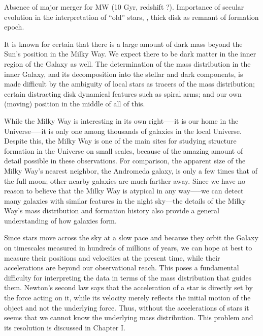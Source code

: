 Absence of major merger for MW (10 Gyr, redshift ?). Importance of
secular evolution in the interpretation of ``old'' stars, \eg, thick
disk as remnant of formation epoch.


It is known for certain that there is a large amount of dark mass
beyond the Sun’s position in the Milky Way. We expect there to be dark
matter in the inner region of the Galaxy as well. The determination of
the mass distribution in the inner Galaxy, and its decomposition into
the stellar and dark components, is made difficult by the ambiguity of
local stars as tracers of the mass distribution; certain distracting
disk dynamical features such as spiral arms; and our own (moving)
position in the middle of all of this.

While the Milky Way is interesting in its own right—--it is our home
in the Universe--—it is only one among thousands of galaxies in the
local Universe. Despite this, the Milky Way is one of the main sites
for studying structure formation in the Universe on small scales,
because of the amazing amount of detail possible in these
observations. For comparison, the apparent size of the Milky Way’s
nearest neighbor, the Andromeda galaxy, is only a few times that of
the full moon; other nearby galaxies are much farther away. Since we
have no reason to believe that the Milky Way is atypical in any
way—--we can detect many galaxies with similar features in the night
sky—the details of the Milky Way’s mass distribution and formation
history also provide a general understanding of how galaxies form.


Since stars move across the sky at a slow pace and because they orbit
the Galaxy on timescales measured in hundreds of millions of years, we
can hope at best to measure their positions and velocities at the
present time, while their accelerations are beyond our observational
reach. This poses a fundamental difficulty for interpreting the data
in terms of the mass distribution that guides them.  Newton’s second
law says that the acceleration of a star is directly set by the force
acting on it, while its velocity merely reflects the initial motion of
the object and not the underlying force. Thus, without the
accelerations of stars it seems that we cannot know the underlying
mass distribution. This problem and its resolution is discussed in
Chapter I.

